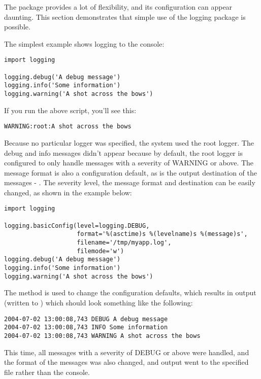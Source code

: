 
The  package provides a lot of flexibility, and its
configuration can appear daunting.  This section demonstrates that simple
use of the logging package is possible.

The simplest example shows logging to the console:

\begin{verbatim}
import logging

logging.debug('A debug message')
logging.info('Some information')
logging.warning('A shot across the bows')
\end{verbatim}

If you run the above script, you'll see this:
\begin{verbatim}
WARNING:root:A shot across the bows
\end{verbatim}

Because no particular logger was specified, the system used the root logger.
The debug and info messages didn't appear because by default, the root
logger is configured to only handle messages with a severity of WARNING
or above. The message format is also a configuration default, as is the output
destination of the messages - . The severity level,
the message format and destination can be easily changed, as shown in
the example below:

\begin{verbatim}
import logging

logging.basicConfig(level=logging.DEBUG,
                    format='%(asctime)s %(levelname)s %(message)s',
                    filename='/tmp/myapp.log',
                    filemode='w')
logging.debug('A debug message')
logging.info('Some information')
logging.warning('A shot across the bows')
\end{verbatim}

The  method is used to change the configuration
defaults, which results in output (written to )
which should look something like the following:

\begin{verbatim}
2004-07-02 13:00:08,743 DEBUG A debug message
2004-07-02 13:00:08,743 INFO Some information
2004-07-02 13:00:08,743 WARNING A shot across the bows
\end{verbatim}

This time, all messages with a severity of DEBUG or above were handled,
and the format of the messages was also changed, and output went to the
specified file rather than the console.

